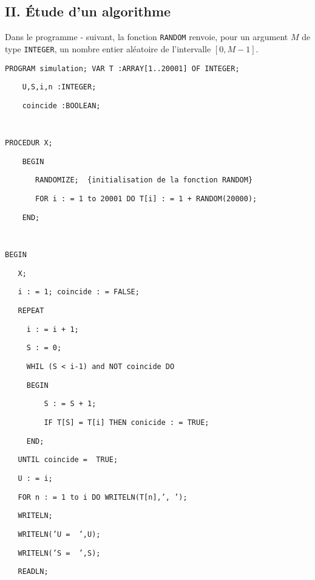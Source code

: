 \documentclass[11pt]{article}%
\begin{document}
\subsection*{II. Étude d'un algorithme}

Dans le programme -\Scilab{} suivant, la fonction \texttt{RANDOM}
renvoie,
pour un argument $M$ de type \texttt{INTEGER}, un nombre entier
aléatoire de
l'intervalle $[0,M-1]$.

\texttt{PROGRAM\ simulation;\ VAR\ T :ARRAY[1..20001]\ OF\ INTEGER;}

\texttt{\ \ \ \ U,S,i,n :INTEGER;}

\texttt{\ \ \ \ coincide :BOOLEAN;}

\texttt{\ }

\texttt{PROCEDUR\E\ X;}

\texttt{\ \ \ \ BEGIN}

\texttt{\ \ \ \ \ \ \ RANDOMIZE;\ \ \{initialisation\ de\ la\ fonction\
RANDOM\}}

\texttt{\ \ \ \ \ \ \ FOR\ i : = 1\ to\ 20001\ DO\ T[i] : = 1 +
RANDOM(20000);}

\texttt{\ \ \ \ END;}

\texttt{\ }

\texttt{BEGIN}

\texttt{\ \ \ X;}

\texttt{\ \ \ i : = 1;\ coincide : = FALSE;}

\texttt{\ \ \ REPEAT}

\texttt{\ \ \ \ \ i : = i + 1;}

\texttt{\ \ \ \ \ S : = 0;}

\texttt{\ \ \ \ \ WHIL\E\ (S < i-1)\ and\ NOT\ coincide\ DO}

\texttt{\ \ \ \ \ BEGIN}

\texttt{\ \ \ \ \ \ \ \ \ S : = S + 1;}

\texttt{\ \ \ \ \ \ \ \ \ IF\ T[S] = T[i]\ THEN\ conicide\ : = TRUE;}

\texttt{\ \ \ \ \ END;}

\texttt{\ \ \ UNTIL\ coincide\ = \ TRUE;}

\texttt{\ \ \ U : = i;}

\texttt{\ \ \ FOR\ n : = 1\ to\ i\ DO\ WRITELN(T[n],',\ ');}

\texttt{\ \ \ WRITELN;}

\texttt{\ \ \ WRITELN('U = \ ',U);}

\texttt{\ \ \ WRITELN('S = \ ',S);}

\texttt{\ \ \ READLN;}
\end{document}
